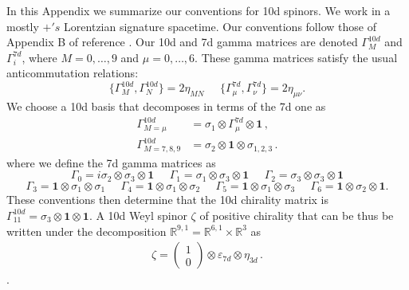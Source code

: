 \documentclass[12pt]{article}%
\numberwithin{equation}{section}
\newcommand{\al}[1]{\begin{align}#1\end{align}}
\renewcommand{\(}{\left(}
\renewcommand{\)}{\right)}
\renewcommand{\[}{\left[}
\renewcommand{\]}{\right]}
\begin{document}
In this Appendix we summarize our conventions for 10d spinors. We work in a mostly $+'s$ Lorentzian signature spacetime.
Our conventions follow those of Appendix B of reference \cite{Polchinski:1998rr}. Our 10d and 7d gamma matrices are denoted $\Gamma^{10d}_M$ and $\Gamma^{7d}_i$, where $M=0,\dots, 9$ and $\mu=0,\dots, 6$. These gamma matrices satisfy the usual anticommutation relations:
\begin{equation}
\{\Gamma^{10d}_{M}, \Gamma^{10d}_{N} \} = 2 \eta_{M N} \; \; \; \; \; \{\Gamma^{7d}_{\mu}, \Gamma^{7d}_{\nu} \} = 2 \eta_{\mu \nu}.
\end{equation}
We choose a 10d basis that decomposes in terms of the 7d one as
%
\al{  \Gamma^{10d}_{M=\mu} &= \sigma_1 \otimes \Gamma^{7d}_\mu \otimes \mathbf{1}\,,\\
\Gamma^{10d}_{M=7,8,9} &= \sigma_2 \otimes \mathbf{1} \otimes \sigma_{1,2,3}\,.
}
%
where we define the 7d gamma matrices as
\begin{equation}
\Gamma_0=i\sigma_2 \otimes \sigma_3 \otimes \mathbf{1}\; \; \; \; \; \Gamma_1=\sigma_1 \otimes \sigma_3 \otimes \mathbf{1} \; \; \; \; \; \Gamma_2=\sigma_3 \otimes \sigma_3 \otimes \mathbf{1}
\end{equation}
\begin{equation}
\Gamma_3=\mathbf{1} \otimes \sigma_1 \otimes \sigma_1 \; \; \; \; \; \Gamma_4=\mathbf{1} \otimes \sigma_1 \otimes \sigma_2 \; \; \; \; \; \Gamma_5=\mathbf{1} \otimes \sigma_1 \otimes \sigma_3 \; \; \; \; \; \Gamma_6=\mathbf{1} \otimes \sigma_2 \otimes \mathbf{1}.
\end{equation}
These conventions then determine that the 10d chirality matrix is $\Gamma^{10d}_{11}=\sigma_3\otimes \mathbf{1}\otimes \mathbf{1}$. A 10d Weyl spinor $\zeta$ of positive chirality that can be thus be written under the decomposition $\mathbb{R}^{9,1}=\mathbb{R}^{6,1}\times \mathbb{R}^3$ as
%
\al{ \zeta = \left(\begin{array}{c} 1 \\ 0\end{array}\right) \otimes \varepsilon_{7d} \otimes \eta_{3d}\,.
}.
%
\end{document}

